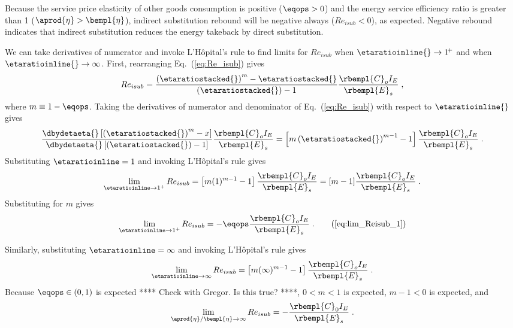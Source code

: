 Because the service price elasticity of other goods consumption is positive ($\eqops > 0$) and
the energy service efficiency ratio is greater than 1 ($\aprod{\eta} > \bempl{\eta}$),
indirect substitution rebound will be negative always ($Re_{isub} < 0$),
as expected.
Negative rebound indicates that indirect substitution reduces the energy takeback by direct substitution.

We can take derivatives of numerator and invoke L'H\^{o}pital's rule
to find limits for $Re_{isub}$ when
$\etaratioinline{} \to 1^{\! +}$ and when
$\etaratioinline{} \to \infty$.
First, rearranging Eq.~(\ref{eq:Re_isub}) gives
%
\begin{equation}
  Re_{isub} = \frac{\left( \etaratiostacked{} \right)^m - \etaratiostacked{}}{\left( \etaratiostacked{} \right) - 1} \frac{\rbempl{C}_o I_E}{\rbempl{E}_s} \; ,
\end{equation}
%
where $m \equiv 1 - \eqops$.
Taking the derivatives of numerator and denominator of Eq.~(\ref{eq:Re_isub})
with respect to $\etaratioinline{}$ gives
%
\begin{equation}
  \frac{\dbydetaeta{} \left[ \left( \etaratiostacked{} \right)^m - x \right]}
            {\dbydetaeta{}\left[ \left( \etaratiostacked{} \right)  - 1 \right] } \frac{\rbempl{C}_o I_E}{\rbempl{E}_s} 
       = \left[ m \left( \etaratiostacked{} \right)^{m-1} - 1 \right] \frac{\rbempl{C}_o I_E}{\rbempl{E}_s} \; .
\end{equation}
%
Substituting $\etaratioinline = 1$ and invoking L'H\^{o}pital's rule gives
%
\begin{equation}
  \lim_{\etaratioinline \to 1^{+}} Re_{isub} 
        = \left[ m ( 1 )^{m-1} - 1 \right] \frac{\rbempl{C}_o I_E}{\rbempl{E}_s}
        = [m - 1] \frac{\rbempl{C}_o I_E}{\rbempl{E}_s} \; .
\end{equation}
%
Substituting for $m$ gives
%
\begin{equation}
  \lim_{\etaratioinline \to 1^{+}} Re_{isub} 
        = -\eqops \frac{\rbempl{C}_o I_E}{\rbempl{E}_s} \; . \tag{\ref{eq:lim_Reisub_1}}
\end{equation}

Similarly, 
substituting $\etaratioinline = \infty$ and invoking L'H\^{o}pital's rule gives
%
\begin{equation}
  \lim_{\etaratioinline \to \infty} Re_{isub} 
        = \left[ m ( \infty )^{m-1} - 1 \right] \frac{\rbempl{C}_o I_E}{\rbempl{E}_s} \; .
\end{equation}
%
Because $\eqops \in (0, 1)$ is expected **** Check with Gregor.  Is this true? ****,
$0 < m < 1$ is expected, $m - 1 < 0$ is expected, and
%
\begin{equation}
  \lim_{\aprod{\eta}/\bempl{\eta} \to \infty} Re_{isub} = -\frac{\rbempl{C}_0 I_E}{\rbempl{E}_s} \; .
\end{equation}


